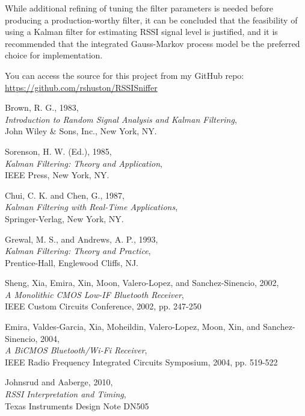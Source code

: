 \documentclass[12pt]{article}
\begin{document}
\clearpage

While additional refining of tuning the filter parameters is needed before producing a
production-worthy filter, it can be concluded that the feasibility of using a Kalman
filter for estimating RSSI signal level is justified, and it is recommended that the
integrated Gauss-Markov process model be the preferred choice for implementation.

You can access the source for this project from my GitHub repo: \\
\textcolor{blue}{\url{https://github.com/rshuston/RSSISniffer}}



%
%

\clearpage

\begin{thebibliography}{9}

Brown, R. G., 1983, \\
\emph{Introduction to Random Signal Analysis and Kalman Filtering}, \\
John Wiley \& Sons, Inc., New York, NY.

Sorenson, H. W. (Ed.), 1985, \\
\emph{Kalman Filtering: Theory and Application}, \\
IEEE Press, New York, NY.

Chui, C. K. and Chen, G., 1987, \\
\emph{Kalman Filtering with Real-Time Applications}, \\
Springer-Verlag, New York, NY.

Grewal, M. S., and Andrews, A. P., 1993, \\
\emph{Kalman Filtering: Theory and Practice}, \\
Prentice-Hall, Englewood Cliffs, NJ.

Sheng, Xia, Emira, Xin, Moon, Valero-Lopez, and Sanchez-Sinencio, 2002, \\
\emph{A Monolithic CMOS Low-IF Bluetooth Receiver}, \\
IEEE Custom Circuits Conference, 2002, pp. 247-250

Emira, Valdes-Garcia, Xia, Moheildin, Valero-Lopez, Moon, Xin, and Sanchez-Sinencio, 2004, \\
\emph{A BiCMOS Bluetooth/Wi-Fi Receiver}, \\
IEEE Radio Frequency Integrated Circuits Symposium, 2004, pp. 519-522

Johnsrud and Aaberge, 2010, \\
\emph{RSSI Interpretation and Timing}, \\
Texas Instruments Design Note DN505

\end{thebibliography}
\end{document}
